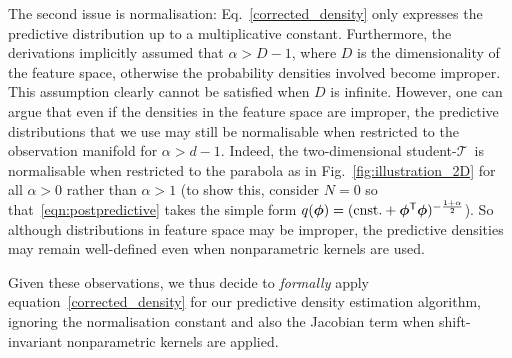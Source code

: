 \documentclass[twoside]{article}
\newcommand{\studentt}{student-$\mathcal{T}$\ }
\newcommand{\transpose}[1]{#1^{\mbox{\sf \scriptsize T}}}
\begin{document}
The second issue is normalisation: Eq.~\eqref{corrected_density} only expresses the predictive distribution up to a multiplicative constant. Furthermore, the derivations implicitly assumed that $\alpha>D-1$, where $D$ is the dimensionality of the feature space, otherwise the probability densities involved become improper. This assumption clearly cannot be satisfied when $D$ is infinite.
However, one can argue that even if the densities in the feature space are improper, the predictive distributions that we use may still be normalisable when restricted to the observation manifold for $\alpha>d-1$. Indeed, the two-dimensional \studentt is normalisable when restricted to the parabola as in Fig.~\ref{fig:illustration_2D} for all $\alpha>0$ rather than $\alpha>1$ (to show this, consider $N=0$ so that~\eqref{eqn:postpredictive} takes the simple form $q(\bm{\phi}) = (\textrm{cnst.}+ \transpose{\bm{\phi}}\bm{\phi})^{-\frac{1+\alpha}{2}}$). So although distributions in feature space may be improper, the predictive densities may remain well-defined even when nonparametric kernels are used.

Given these observations, we thus decide to \emph{formally} apply equation~\eqref{corrected_density} for our predictive density estimation algorithm, ignoring the normalisation constant and also the Jacobian term when shift-invariant nonparametric kernels are applied.
\end{document}
